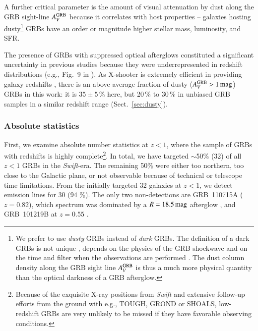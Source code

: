 \documentclass[traditabstract, longauth]{aa}
\begin{document}
A further critical parameter is the amount of visual attenuation by dust along the GRB sight-line $A^{\rm{GRB}}_V$ \citep{2011A&A...534A.108K, 2012ApJ...756..187H, 2013ApJ...778..128P, 2015ApJ...801..102P} because it correlates with host properties -- galaxies hosting dusty\footnote{We prefer to use \textit{dusty} GRBs instead of \textit{dark} GRBs. The definition of a dark GRBs is not unique \citep{2004ApJ...617L..21J, 2009ApJ...699.1087V}, depends on the physics of the GRB shockwave and on the time and filter when the observations are performed \citep{2011A&A...526A..30G}. The dust column density along the GRB sight line  $A^{\rm{GRB}}_V$ is thus a much more physical quantity than the optical darkness of a GRB afterglow.} GRBs have an order or magnitude higher stellar mass, luminosity, and SFR. 

The presence of GRBs with suppressed optical afterglows \citep[e.g.,][]{1998ApJ...493L..27G, 2006ApJ...647..471L} constituted a significant uncertainty in previous studies because they were underrepresented in redshift distributions (e.g., Fig.~9 in \citealp{2012ApJ...756..187H}). As X-shooter is extremely efficient in providing galaxy redshifts \citep{2012ApJ...758...46K}, there is an above average fraction of dusty ($A^{\rm{GRB}}_V>1\,\rm{mag}$) GRBs in this work: it is $35\pm5\,\%$  here, but 20\,\% to 30\,\% in unbiased GRB samples \citep{2011A&A...526A..30G, 2012MNRAS.421.1265M, 2014arXiv1412.6530L} in a similar redshift range (Sect.~\ref{sec:dusty}).

\subsubsection{Absolute statistics}
\label{sec:absstat}

{First, we examine absolute number statistics at $z<1$, where the sample of GRBs with redshifts is highly complete\footnote{Because of the exquisite X-ray positions from \textit{Swift} and extensive follow-up efforts from the ground with e.g., TOUGH, GROND or SHOALS, low-redshift GRBs are very unlikely to be missed if they have favorable observing conditions.}. In total, we have targeted $\sim$50\% (32) of all $z<1$ GRBs in the \textit{Swift}-era. The remaining 50\% were either too northern, too close to the Galactic plane, or not observable because of technical or telescope time limitations. From the initially targeted 32 galaxies at $z<1$, we detect emission lines for 30 (94 \%). The only two non-detections are GRB~110715A ($z=0.82$), which spectrum was dominated by a $R=18.5\,\rm{mag}$ afterglow \citep{2011GCN..12164...1P}, and GRB~101219B at $z=0.55$ \citep{2011ApJ...735L..24S}.}
\end{document}
